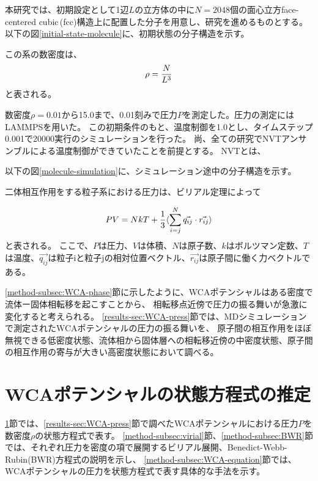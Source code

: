 \documentclass[titlepage]{jsreport}
\begin{document}
{{{本研究では、初期設定として1辺$L$の立方体の中に$N=2048$個の面心立方face-centered cubic\,(fcc)構造上に配置した分子を用意し、研究を進めるものとする。
以下の図\ref{initial-state-molecule}に、初期状態の分子構造を示す。

この系の数密度は、
\large
\begin{equation}
\rho = {\frac{N}{L^3}}{\label{eq:density}}
\end{equation}
\normalsize
と表される。

数密度$\rho=0.01$から15.0まで、0.01刻みで圧力$P$を測定した。圧力の測定にはLAMMPSを用いた。
この初期条件のもと、温度制御を1.0とし、タイムステップ0.001で20000実行のシミュレーションを行った。
尚、全ての研究でNVTアンサンブルによる温度制御ができていたことを前提とする。
NVTとは、

以下の図\ref{molecule-simulation}に、シミュレーション途中の分子構造を示す。


二体相互作用をする粒子系における圧力は、ビリアル定理によって

\large
\begin{equation}
PV=NkT+{\frac{1}{3}}\langle\sum_{i=j}^N\vec{q_{ij}} \cdot \vec{r_{ij}}\rangle{\label{eq:Theoritical-pressure}}
\end{equation}
\normalsize
と表される\cite{Theoritical-pressure,virial-therom}。
ここで、$P$は圧力、$V$は体積、$N$は原子数、$k$はボルツマン定数、$T$は温度、$\vec{q_{ij}}$は粒子iと粒子jの相対位置ベクトル、$\vec{r_{ij}}$は原子間に働く力ベクトルである。

\ref{method-subsec:WCA-phase}節に示したように、WCAポテンシャルはある密度で流体ー固体相転移を起こすことから、
相転移点近傍で圧力の振る舞いが急激に変化すると考えられる。
\ref{results-sec:WCA-press}節では、MDシミュレーションで測定されたWCAポテンシャルの圧力の振る舞いを、
原子間の相互作用をほぼ無視できる低密度状態、流体相から固体層への相転移近傍の中密度状態、原子間の相互作用の寄与が大きい高密度状態において調べる。

\section{WCAポテンシャルの状態方程式の推定}\label{method-sec:WCA-equation}
\ref{method-sec:WCA-equation}節では、\ref{results-sec:WCA-press}節で調べたWCAポテンシャルにおける圧力$P$を数密度$\rho$の状態方程式で表す。
\ref{method-subsec:virial}節、\ref{method-subsec:BWR}節では、それぞれ圧力を密度の項で展開するビリアル展開、Benedict-Webb-Rubin(BWR)方程式の説明を示し、
\ref{method-subsec:WCA-equation}節では、WCAポテンシャルの圧力を状態方程式で表す具体的な手法を示す。

}}}
\end{document}
